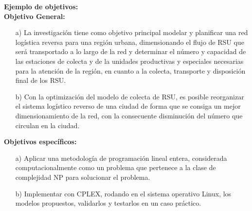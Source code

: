 \documentclass[a4paper, 12pt]{article}
\begin{document}
{\bf Ejemplo de objetivos:}\\
{\bf Objetivo General:}
\begin{enumerate}
\item[a)] La investigación tiene como objetivo principal modelar y planificar una red logística reversa para una región urbana, dimensionando el flujo de RSU que será transportado a lo largo de la red y determinar el número y capacidad de las estaciones de colecta y de la unidades productivas y especiales necesarias para la atención de la región, en cuanto a la colecta, transporte y disposición final de los RSU.
\vskip 0.3cm
\item[b)]Con la optimización del modelo de colecta de RSU, es posible reorganizar el sistema logístico reverso de una ciudad de forma que se consiga un mejor dimensionamiento de la red, con la consecuente disminución del número que circulan en la ciudad.

\end{enumerate}
\vskip 0.2cm
{\bf Objetivos específicos:}
\begin{enumerate}
\item[a)] Aplicar una metodología de programación lineal entera, considerada computacionalmente como un problema que pertenece a la clase de complejidad NP \citep{Korte} para solucionar el problema.
\item[b)] Implementar con CPLEX, rodando en el sistema operativo Linux, los modelos propuestos, validarlos y testarlos en un caso práctico.

\end{enumerate}
\end{document}
